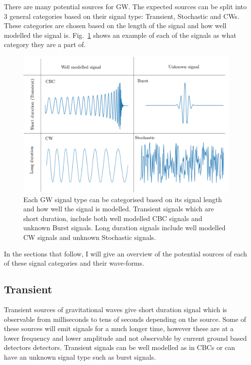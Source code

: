 There are many potential sources for \ac{GW}. The expected sources can be split into 3 general categories based on their signal type: Transient, Stochastic and \acp{CW}.
These categories are chosen based on the length of the signal and how well modelled the signal is.
Fig.~\ref{intro:sources:signaltypes} shows an example of each of the signals as what category they are a part of.
%
\begin{figure}[h]
    \centering
    \includegraphics[width=\textwidth]{C1_Introduction/sources_types.pdf}
    \caption{Each \ac{GW} signal type can be categorised based on its signal length and how well the signal is modelled. Transient signals which are short duration, include both well modelled \ac{CBC} signals and unknown Burst signals. Long duration signals include well modelled \ac{CW} signals and unknown Stochastic signals.}
    \label{intro:sources:signaltypes}
\end{figure}
In the sections that follow, I will give an overview of the potential sources of each of these signal categories and their wave-forms.


\subsection{\label{sources:transient} Transient}

Transient sources of gravitational waves give short duration signal which is observable from milliseconds to tens of seconds depending on the source. 
Some of these sources will emit signals for a much longer time, however these are at a lower frequency and lower amplitude and not observable by current ground based detectors detectors.
Transient signals can be well modelled as in \acp{CBC} or can have an unknown signal type such as burst signals.

